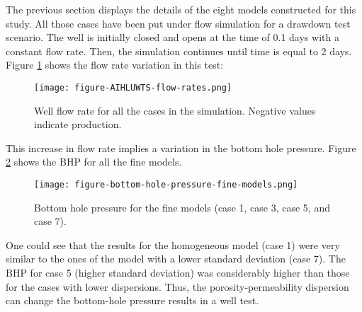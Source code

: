 The previous section displays the details of the eight models constructed for this study.
%
All those cases have been put under flow simulation for a drawdown test scenario.
%
The well is initially closed and opens at the time of 0.1 days with a constant flow rate.
%
Then, the simulation continues until time is equal to 2 days.
%
Figure \ref{figure-AIHLUWTS-flow-rates} shows the flow rate variation in this test:
%
\begin{figure}[H]
	\centering
	\texttt{[image: figure-AIHLUWTS-flow-rates.png]}
	\caption{Well flow rate for all the cases in the simulation. Negative values indicate production.}
	\label{figure-AIHLUWTS-flow-rates}
\end{figure}
\noindent
%
This increase in flow rate implies a variation in the bottom hole pressure.
%
Figure \ref{figure-bottom-hole-pressure-fine-models} shows the BHP for all the fine models.
%
\begin{figure}[H]
	\centering
	\texttt{[image: figure-bottom-hole-pressure-fine-models.png]}
	\caption{Bottom hole pressure for the fine models (case 1, case 3, case 5, and case 7).}
	\label{figure-bottom-hole-pressure-fine-models}
\end{figure}
\noindent
%
One could see that the results for the homogeneous model (case 1) were very similar to the ones of the model with a lower standard deviation (case 7).
%
The BHP for case 5 (higher standard deviation) was considerably higher than those for the cases with lower dispersions.
%
Thus, the porosity-permeability dispersion can change the bottom-hole pressure results in a well test. 

